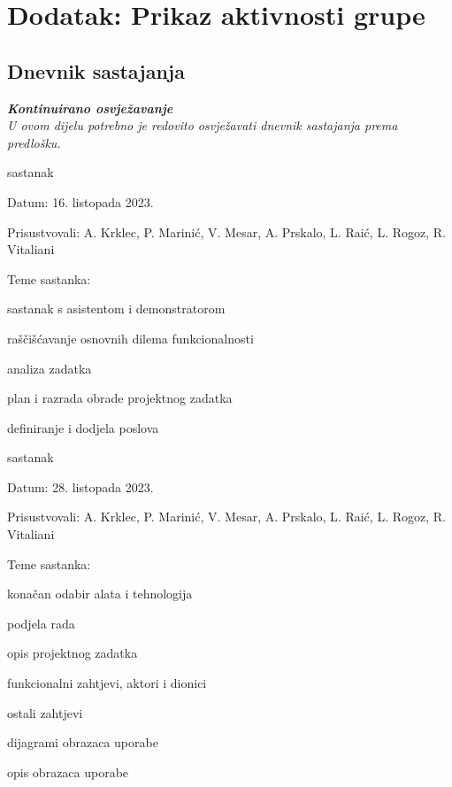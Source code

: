 \chapter*{Dodatak: Prikaz aktivnosti grupe}

\section*{Dnevnik sastajanja}

\textbf{\textit{Kontinuirano osvježavanje}}\\

\textit{U ovom dijelu potrebno je redovito osvježavati dnevnik sastajanja prema predlošku.}

\begin{packed_enum}
	\item  sastanak
	
	\item[] \begin{packed_item}
		\item Datum: 16. listopada 2023.
		\item Prisustvovali: A. Krklec, P. Marinić, V. Mesar, A. Prskalo, L. Raić, L. Rogoz, R. Vitaliani
		\item Teme sastanka:
		\begin{packed_item}
			\item sastanak s asistentom i demonstratorom
			\item raščišćavanje osnovnih dilema funkcionalnosti
			\item analiza zadatka
			\item plan i razrada obrade projektnog zadatka
			\item definiranje i dodjela poslova
		\end{packed_item}
	\end{packed_item}
	
	\item  sastanak
	\item[] \begin{packed_item}
		\item Datum: 28. listopada 2023.
		\item Prisustvovali: A. Krklec, P. Marinić, V. Mesar, A. Prskalo, L. Raić, L. Rogoz, R. Vitaliani
		\item Teme sastanka:
		\begin{packed_item}
			\item konačan odabir alata i tehnologija
			\item podjela rada
			\item opis projektnog zadatka
			\item funkcionalni zahtjevi, aktori i dionici
			\item ostali zahtjevi
			\item dijagrami obrazaca uporabe
			\item opis obrazaca uporabe
		\end{packed_item}
	\end{packed_item}
	

\end{packed_enum}
